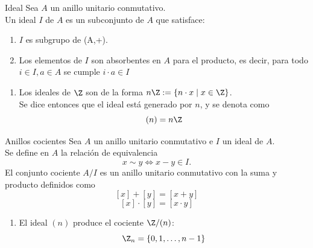 \documentclass[10pt,t]{beamer}
\begin{document}
\begin{frame}
    \begin{block}{\centering \large Ideal}
        Sea $A$ un anillo unitario conmutativo.\\
        Un ideal $I$ de $A$ es un subconjunto de $A$ que satisface:
    \begin{enumerate}[label=\roman*)]
        \item $I$ es subgrupo de (A,+).
        \item Los elementos de $I$ son absorbentes en $A$ para el producto, es decir, para todo $i \in I, a\in A$ se cumple $i\cdot a \in I$
    \end{enumerate}
    \end{block}

    \begin{plainexample}
        \begin{enumerate}[label=--]
            \item Los ideales de $\Z$ son de la forma $n\Z:= \{ n \cdot x\mid x\in\Z\}$.\\[1ex]
                Se dice entonces que el ideal está generado por $n$, y se denota como
                \[(n) = n\Z\]
        \end{enumerate}
    \end{plainexample}
\end{frame}

\begin{frame}
    \begin{block}{\centering \large Anillos cocientes}
        Sea $A$ un anillo unitario conmutativo e $I$ un ideal de $A$.\\
        Se define en $A$ la relación de equivalencia 
            \vspace{-0.5em}
            \[x \sim y \iff x -y \in I.\]
        El conjunto cociente $A/I$ es un anillo unitario conmutativo con la suma y producto definidos como
        \[[x] + [y] = [x + y]\]
        \[[x] \cdot [y] = [x \cdot y]\]
    \end{block}

    \begin{plainexample}
        \begin{enumerate}[label=--]
            \setlength{\itemsep}{-0.2em}
            \item El ideal $(n)$ produce el cociente $\Z/(n)$:
                \vspace{-0.5em}
                \[\Z_n = \{0,1, \ldots, n-1\}\]
        \end{enumerate}
    \end{plainexample}
\end{frame}
\end{document}
